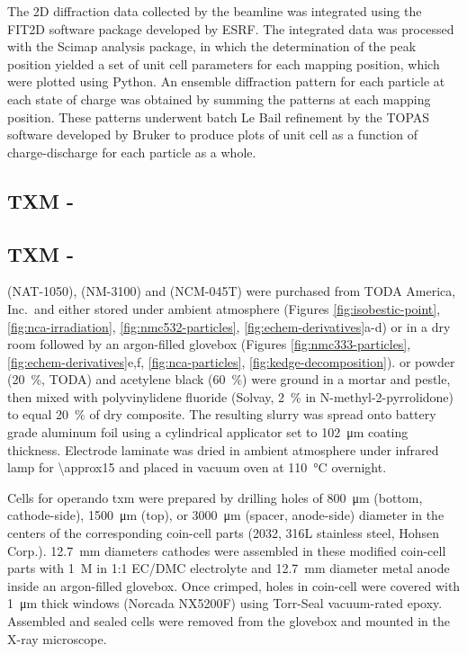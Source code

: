 \documentclass{article}
\begin{document}
The 2D diffraction data collected by the beamline was integrated using
the FIT2D software package developed by
ESRF\cite{hausermann1996,hammersley1997}. The integrated data was
processed with the Scimap analysis package\cite{scimap}, in which the
determination of the peak position yielded a set of unit cell
parameters for each mapping position, which were plotted using
Python. An ensemble diffraction pattern for each particle at each
state of charge was obtained by summing the patterns at each mapping
position. These patterns underwent batch Le Bail refinement by the
TOPAS software developed by Bruker to produce plots of unit cell as a
function of charge-discharge for each particle as a whole.

\subsection{TXM - \nca{}}


\subsection{TXM - \nmc{}}

\nca{} (NAT-1050), \nmc[333]{} (NM-3100) and \nmc[532]{} (NCM-045T)
were purchased from TODA America, Inc.\ and either stored under
ambient atmosphere (Figures \ref{fig:isobestic-point},
\ref{fig:nca-irradiation}, \ref{fig:nmc532-particles},
\ref{fig:echem-derivatives}a-d) or in a dry room followed by an
argon-filled glovebox (Figures \ref{fig:nmc333-particles},
\ref{fig:echem-derivatives}e,f, \ref{fig:nca-particles},
\ref{fig:kedge-decomposition}). \nca{} or \nmc{} powder
(\SI{20}{\percent}, TODA) and acetylene black (\SI{60}{\percent}) were
ground in a mortar and pestle, then mixed with polyvinylidene fluoride
(Solvay, \SI{2}{\percent} in N-methyl-2-pyrrolidone) to equal
\SI{20}{\percent} of dry composite. The resulting slurry was spread
onto battery grade aluminum foil using a cylindrical applicator set to
\SI{102}{\micro\meter} coating thickness. Electrode laminate was dried
in ambient atmosphere under infrared lamp for \SI{\approx15}{\min} and
placed in vacuum oven at \SI{110}{\celsius} overnight.

Cells for operando \gls{txm} were prepared by drilling holes of
\SI{800}{\micro\meter} (bottom, cathode-side), \SI{1500}{\micro\meter}
(top), or \SI{3000}{\micro\meter} (spacer, anode-side) diameter in the
centers of the corresponding coin-cell parts (2032, 316L stainless
steel, Hohsen Corp.). \SI{12.7}{\milli\meter} diameters cathodes were
assembled in these modified coin-cell parts with \SI{1}{M} 
in 1:1 EC/DMC electrolyte and \SI{12.7}{\milli\meter} diameter 
metal anode inside an argon-filled glovebox. Once crimped, holes in
coin-cell were covered with \SI{1}{\micro\meter} thick 
windows (Norcada NX5200F) using Torr-Seal vacuum-rated
epoxy. Assembled and sealed cells were removed from the glovebox and
mounted in the X-ray microscope.
\end{document}
